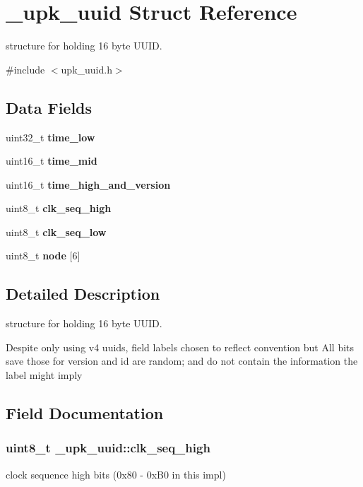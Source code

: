 \section{\_\-upk\_\-uuid Struct Reference}
\label{struct__upk__uuid}


structure for holding 16 byte UUID.  




{\ttfamily \#include $<$upk\_\-uuid.h$>$}

\subsection*{Data Fields}
\begin{DoxyCompactItemize}
\item 
uint32\_\-t {\bf time\_\-low}
\item 
uint16\_\-t {\bf time\_\-mid}
\item 
uint16\_\-t {\bf time\_\-high\_\-and\_\-version}
\item 
uint8\_\-t {\bf clk\_\-seq\_\-high}
\item 
uint8\_\-t {\bf clk\_\-seq\_\-low}
\item 
uint8\_\-t {\bf node} [6]
\end{DoxyCompactItemize}


\subsection{Detailed Description}
structure for holding 16 byte UUID. 

Despite only using v4 uuids, field labels chosen to reflect convention but All bits save those for version and id are random; and do not contain the information the label might imply 

\subsection{Field Documentation}
\subsubsection[{clk\_\-seq\_\-high}]{\setlength{\rightskip}{0pt plus 5cm}uint8\_\-t {\bf \_\-upk\_\-uuid::clk\_\-seq\_\-high}}\label{struct__upk__uuid_a9381639878467a2c59e90271b7a6525f}
clock sequence high bits (0x80 -\/ 0xB0 in this impl) 


